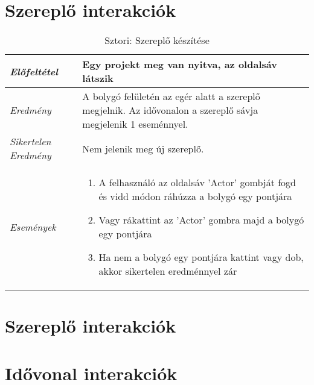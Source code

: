 \section{Szereplő interakciók}

\begin{table}[H]
	\centering
	\begin{tabular}{ | m{} | m{} | }
		\hline
		\emph{Előfeltétel} & Egy projekt meg van nyitva, az oldalsáv látszik  \\
		\hline
		\emph{Eredmény} & A bolygó felületén az egér alatt a szereplő megjelnik. Az idővonalon a szereplő sávja megjelenik 1 eseménnyel.   \\
		\hline
		\emph{Sikertelen Eredmény} & Nem jelenik meg új szereplő.  \\
		\hline
		\hline
		\emph{Események} &

		\begin{enumerate}
			\item A felhasználó az oldalsáv 'Actor' gombját fogd és vidd módon ráhúzza a bolygó egy pontjára
			\item Vagy rákattint az 'Actor' gombra majd a bolygó egy pontjára
			\item Ha nem a bolygó egy pontjára kattint vagy dob, akkor sikertelen eredménnyel zár
		\end{enumerate}

		\\
		\hline
	\end{tabular}
	\caption{Sztori: Szereplő készítése}
	\label{tab:story-actor-create}
\end{table}


\section{Szereplő interakciók}

\section{Idővonal interakciók}

